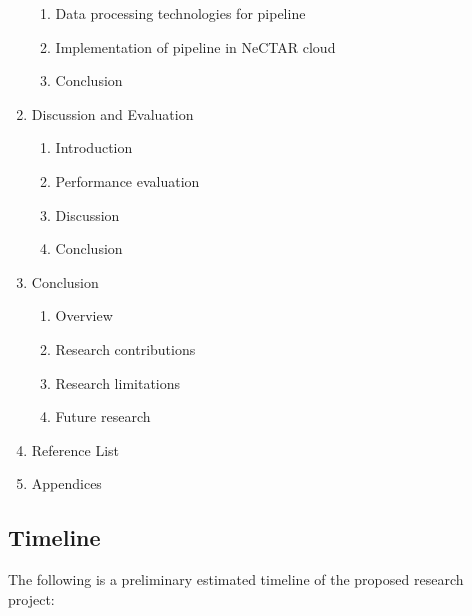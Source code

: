 \documentclass[a4paper,11pt]{article}
\begin{document}
\begin{enumerate}
\begin{enumerate}[label*=\arabic*.]
    \item Data processing technologies for pipeline
    \item Implementation of pipeline in NeCTAR cloud
    \item Conclusion
  \end{enumerate}
  \item Discussion and Evaluation
  \begin{enumerate}[label*=\arabic*.]
    \item Introduction
    \item Performance evaluation
    \item Discussion
    \item Conclusion
  \end{enumerate}
  \item Conclusion
  \begin{enumerate}[label*=\arabic*.]
    \item Overview
    \item Research contributions
    \item Research limitations
    \item Future research
  \end{enumerate}
  \item Reference List
  \item Appendices
\end{enumerate}


\subsection{Timeline} %
\label{sub:timeline}

The following is a preliminary estimated timeline of the proposed research project:
\end{document}
